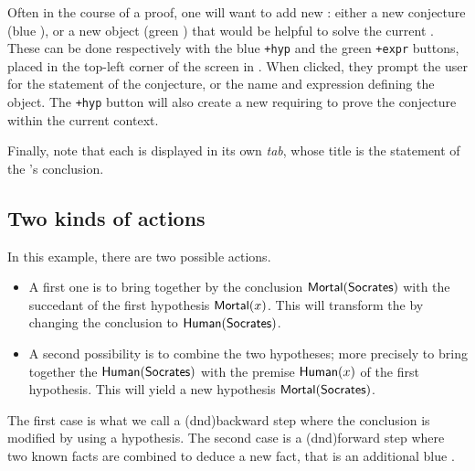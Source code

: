 \begin{scope}
Often in the course of a proof, one will want to add new : either a
new conjecture (blue ), or a new object (green ) that would be
helpful to solve the current . These can be done respectively with the
blue \texttt{+hyp} and the green \texttt{+expr} buttons, placed in the top-left
corner of the screen in . When clicked, they prompt the user
for the statement of the conjecture, or the name and expression defining the
object. The \texttt{+hyp} button will also create a new
 requiring to prove the conjecture within the current context.

Finally, note that each  is displayed in its own \emph{tab}, whose
title is the statement of the 's conclusion.

\subsection{Two kinds of actions}

\AP
In this example, there are two possible actions.

\begin{itemize}
\item A first one is to bring together by  the conclusion
$\mbox{\textsf{Mortal}}(\mbox{\textsf{Socrates}})$ with the succedant of the first hypothesis $\mbox{\textsf{Mortal}}(x)$.
This will transform the  by changing the conclusion to
$\mbox{\textsf{Human}}(\mbox{\textsf{Socrates}})$.
\item A second possibility is to combine the two hypotheses; more precisely to
bring together the  $\mbox{\textsf{Human}}(\mbox{\textsf{Socrates}})$ with the premise $\mbox{\textsf{Human}}(x)$ of
the first hypothesis. This will yield a new hypothesis $\mbox{\textsf{Mortal}}(\mbox{\textsf{Socrates}})$.
\end{itemize}

The first case is what we call a \intro(dnd){backward} step where the conclusion
is modified by using a hypothesis. The second case is a \intro(dnd){forward}
step where two known facts are combined to deduce a new fact, that is an
additional blue .


\end{scope}
